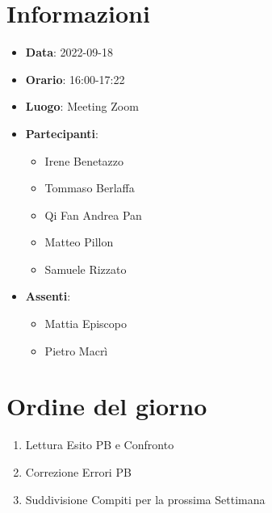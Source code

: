 \section{Informazioni}
	\begin{itemize}
		\item \textbf{Data}: 2022-09-18     %
		\item \textbf{Orario}: 16:00-17:22  %
		\item \textbf{Luogo}: Meeting Zoom
		\item \textbf{Partecipanti}:
		\begin{itemize}
			\item Irene Benetazzo
			\item Tommaso Berlaffa
			\item Qi Fan Andrea Pan
			\item Matteo Pillon
			\item Samuele Rizzato
		\end{itemize}
    \item \textbf{Assenti}: 
    \begin{itemize}
      \item Mattia Episcopo 
      \item Pietro Macrì
    \end{itemize}   
	\end{itemize}
    
	\section{Ordine del giorno}
	\begin{enumerate}
		\item Lettura Esito PB e Confronto
		\item Correzione Errori PB
		\item Suddivisione Compiti per la prossima Settimana
	\end{enumerate}
\newpage